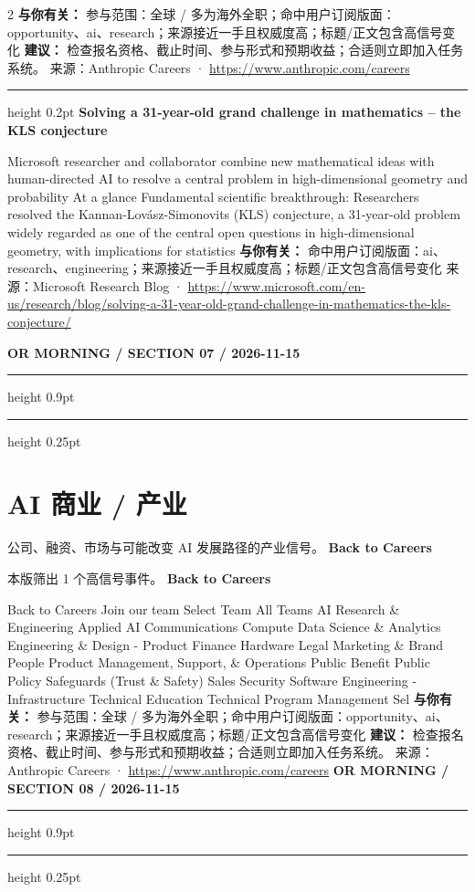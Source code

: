 \documentclass[10.5pt]{ctexart}
\begin{document}
\begin{multicols}{2}
\textbf{与你有关：} 参与范围：全球 / 多为海外全职；命中用户订阅版面：opportunity、ai、research；来源接近一手且权威度高；标题/正文包含高信号变化
\textbf{建议：} 检查报名资格、截止时间、参与形式和预期收益；合适则立即加入任务系统。
{\footnotesize\color{ormuted} 来源：Anthropic Careers · \url{https://www.anthropic.com/careers}}
\vspace{2mm}
\hrule height 0.2pt
\vspace{2mm}
{\large\bfseries Solving a 31-year-old grand challenge in mathematics – the KLS conjecture}\par
Microsoft researcher and collaborator combine new mathematical ideas with human-directed AI to resolve a central problem in high-dimensional geometry and probability At a glance Fundamental scientific breakthrough: Researchers resolved the Kannan-Lovász-Simonovits (KLS) conjecture, a 31-year-old problem widely regarded as one of the central open questions in high-dimensional geometry, with implications for statistics
\textbf{与你有关：} 命中用户订阅版面：ai、research、engineering；来源接近一手且权威度高；标题/正文包含高信号变化
{\footnotesize\color{ormuted} 来源：Microsoft Research Blog · \url{https://www.microsoft.com/en-us/research/blog/solving-a-31-year-old-grand-challenge-in-mathematics-the-kls-conjecture/}}
\end{multicols}
\newpage
{\small\bfseries OR MORNING / SECTION 07 / 2026-11-15}
\vspace{2mm}
\hrule height 0.9pt
\vspace{1.5mm}
\hrule height 0.25pt
\vspace{4mm}
\section*{AI 商业 / 产业}
{\color{ormuted} 公司、融资、市场与可能改变 AI 发展路径的产业信号。}
\vspace{2mm}
{\LARGE\bfseries Back to Careers}\par
\vspace{1mm}
{\color{ormuted} 本版筛出 1 个高信号事件。}
\vspace{3mm}
{\Large\bfseries Back to Careers}\par
Back to Careers Join our team Select Team All Teams AI Research \& Engineering Applied AI Communications Compute Data Science \& Analytics Engineering \& Design - Product Finance Hardware Legal Marketing \& Brand People Product Management, Support, \& Operations Public Benefit Public Policy Safeguards (Trust \& Safety) Sales Security Software Engineering - Infrastructure Technical Education Technical Program Management Sel
\textbf{与你有关：} 参与范围：全球 / 多为海外全职；命中用户订阅版面：opportunity、ai、research；来源接近一手且权威度高；标题/正文包含高信号变化
\textbf{建议：} 检查报名资格、截止时间、参与形式和预期收益；合适则立即加入任务系统。
{\footnotesize\color{ormuted} 来源：Anthropic Careers · \url{https://www.anthropic.com/careers}}
\newpage
{\small\bfseries OR MORNING / SECTION 08 / 2026-11-15}
\vspace{2mm}
\hrule height 0.9pt
\vspace{1.5mm}
\hrule height 0.25pt
\vspace{4mm}
\end{document}
